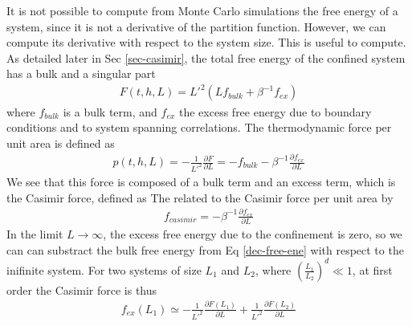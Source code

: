 It is not possible to compute from Monte Carlo simulations the free energy of a system, since it is not a derivative of the partition function. However, we can compute its derivative with respect to the system size. This is useful to compute.
As detailed later in Sec \ref{sec-casimir}, the total free energy of the confined system has a bulk and a singular part
\begin{align}
    F(t,h,L) = L'^2 \left( L f_{bulk} + \beta^{-1} f_{ex} \right)
    \label{dec-free-ene}
\end{align}
where $f_{bulk}$ is a bulk term, and $f_{ex}$ the excess free energy due to boundary conditions and to system spanning correlations. 
The thermodynamic force per unit area is defined as 
\begin{align}
p(t,h,L) = - \frac{1}{L'^2 }\frac{\partial F}{\partial L} = - f_{bulk} - \beta^{-1} \frac{\partial f_{ex}}{\partial L}
\label{casmir-mc}
\end{align}
We see that this force is composed of a bulk term and an excess term, which is the Casimir force, defined as
The related to the Casimir force per unit area by
\begin{align}
   f_{casimir} = - \beta^{-1} \frac{\partial  f_{ex}}{\partial L}
\end{align}
In the limit $L\to \infty$, the excess free energy due to the confinement is zero, so we can can substract the bulk free energy from Eq \eqref{dec-free-ene} with respect to the inifinite system. For two systems of size $L_1$  and $L_2$, where $ \left( \frac{L_1}{L_2} \right)^d \ll 1$, at first order the Casimir force is thus
\begin{align}
    f_{ex}(L_1) \simeq - \frac{1}{L'^2} \frac{\partial F(L_1)}{\partial L} + \frac{1}{L'^2} \frac{\partial F(L_2)}{\partial L}
    \label{cas-diff}
\end{align}



